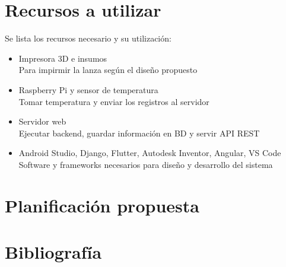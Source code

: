 \documentclass[12pt, letterpaper]{article}
\begin{document}
\section{Recursos a utilizar}
Se lista los recursos necesario y su utilización:
\begin{itemize}
	\item Impresora 3D e insumos\\
	Para impirmir la lanza según el diseño propuesto
	\item Raspberry Pi y sensor de temperatura\\
	Tomar temperatura y enviar los registros al servidor
	\item Servidor web\\
	Ejecutar backend, guardar información en BD y servir API REST
	\item Android Studio, Django, Flutter, Autodesk Inventor, Angular,  VS Code\\
	Software y frameworks necesarios para diseño y desarrollo del sistema
	
\end{itemize}
\section{Planificación propuesta }

\section{Bibliografía}
\end{document}
